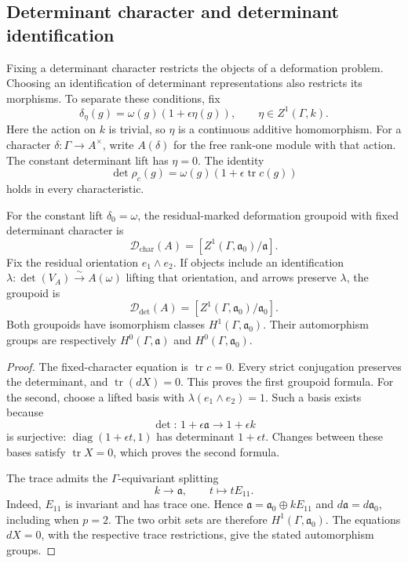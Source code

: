 \subsection{Determinant character and determinant identification}

Fixing a determinant character restricts the objects of a deformation
problem. Choosing an identification of determinant representations also
restricts its morphisms. To separate these conditions, fix
\[
 \delta_\eta(g)=\omega(g)(1+\epsilon\eta(g)),\qquad
 \eta\in Z^1(\Gamma,k).
\]
Here the action on \(k\) is trivial, so \(\eta\) is a continuous additive
homomorphism. For a character \(\delta:\Gamma\to A^\times\), write \(A(\delta)\) for the free rank-one module with that action.
The constant determinant lift has \(\eta=0\).
The identity
\[
 \det\rho_c(g)=\omega(g)(1+\epsilon\operatorname{tr}c(g))
\]
holds in every characteristic.

\begin{proposition}
\label{v4-arith:local-cyclotomic:determinant}
For the constant lift \(\delta_0=\omega\), the residual-marked deformation
groupoid with fixed determinant character is
\[
 \mathcal D_{\mathrm{char}}(A)
 =[Z^1(\Gamma,\mathfrak a_0)/\mathfrak a].
\]
Fix the residual orientation \(e_1\wedge e_2\).
If objects include an identification
\(\lambda:\det(V_A)\xrightarrow{\sim}A(\omega)\) lifting that orientation,
and arrows preserve \(\lambda\), the groupoid is
\[
 \mathcal D_{\mathrm{det}}(A)
 =[Z^1(\Gamma,\mathfrak a_0)/\mathfrak a_0].
\]
Both groupoids have isomorphism classes \(H^1(\Gamma,\mathfrak a_0)\).
Their automorphism groups are respectively \(H^0(\Gamma,\mathfrak a)\)
and \(H^0(\Gamma,\mathfrak a_0)\).
\end{proposition}

\begin{proof}
The fixed-character equation is \(\operatorname{tr}c=0\).
Every strict conjugation preserves the determinant, and
\(\operatorname{tr}(dX)=0\). This proves the first groupoid formula.
For the second, choose a lifted basis with
\(\lambda(e_1\wedge e_2)=1\).
Such a basis exists because
\[
 \det:\,1+\epsilon\mathfrak a\longrightarrow1+\epsilon k
\]
is surjective: \(\operatorname{diag}(1+\epsilon t,1)\) has determinant
\(1+\epsilon t\). Changes between these bases satisfy
\(\operatorname{tr}X=0\), which proves the second formula.

The trace admits the \(\Gamma\)-equivariant splitting
\[
 k\longrightarrow\mathfrak a,\qquad t\longmapsto tE_{11}.
\]
Indeed, \(E_{11}\) is invariant and has trace one. Hence
\(\mathfrak a=\mathfrak a_0\oplus kE_{11}\) and
\(d\mathfrak a=d\mathfrak a_0\), including when \(p=2\).
The two orbit sets are therefore \(H^1(\Gamma,\mathfrak a_0)\).
The equations \(dX=0\), with the respective trace restrictions,
give the stated automorphism groups.
\end{proof}


